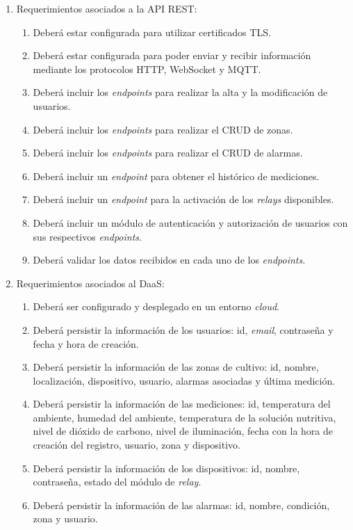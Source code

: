 \begin{enumerate}
	\item Requerimientos asociados a la API REST:
		\begin{enumerate}
			\item Deberá estar configurada para utilizar certificados TLS.
			\item Deberá estar configurada para poder enviar y recibir información mediante los protocolos HTTP, WebSocket y MQTT.
			\item Deberá incluir los \textit{endpoints} para realizar la alta y la modificación de usuarios.
			\item Deberá incluir los \textit{endpoints} para realizar el CRUD de zonas.
			\item Deberá incluir los \textit{endpoints} para realizar el CRUD de alarmas.
			\item Deberá incluir un \textit{endpoint} para obtener el histórico de mediciones.
			\item Deberá incluir un \textit{endpoint} para la activación de los \textit{relays} \citep{WEBSITE:RELAY} disponibles.
			\item Deberá incluir un módulo de autenticación y autorización de usuarios con sus respectivos \textit{endpoints}.
			\item Deberá validar los datos recibidos en cada uno de los \textit{endpoints}.
		\end{enumerate}
		
	\item Requerimientos asociados al DaaS:
		\begin{enumerate}
			\item Deberá ser configurado y desplegado en un entorno \textit{cloud}.
			\item Deberá persistir la información de los usuarios: id, \textit{email}, contraseña y fecha y hora de creación.
			\item Deberá persistir la información de las zonas de cultivo: id, nombre, localización, dispositivo, usuario, alarmas asociadas y última medición.
			\item Deberá persistir la información de las mediciones: id, temperatura del ambiente, humedad del ambiente, temperatura de la solución nutritiva, nivel de dióxido de carbono, nivel de iluminación, fecha con la hora de creación del registro, usuario, zona y dispositivo.
			\item Deberá persistir la información de los dispositivos: id, nombre, contraseña, estado del módulo de \textit{relay}.
			\item Deberá persistir la información de las alarmas: id, nombre, condición, zona y usuario.
		\end{enumerate}
		

\end{enumerate}
